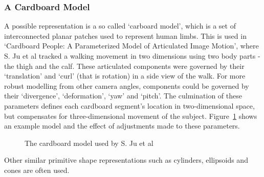 \subsubsection{A Cardboard Model}

A possible representation is a so called `carboard model', which is a set of interconnected planar patches used to represent human limbs. This is used in `Cardboard People: A Parameterized Model of Articulated Image Motion'\cite{cardboardpeople}, where S. Ju et al tracked a walking movement in two dimensions using two body parts - the thigh and the calf. These articulated components were governed by their `translation' and `curl' (that is rotation) in a side view of the walk. For more robust modelling from other camera angles, components could be governed by their `divergence', `deformation', `yaw' and `pitch'. The culmination of these parameters defines each cardboard segment's location in two-dimensional space, but compensates for three-dimensional movement of the subject. Figure~\ref{fig:cardboardmodel} shows an example model and the effect of adjustments made to these parameters.

\begin{figure}[H]
    \centering
\caption{The cardboard model used by S. Ju et al\cite{cardboardpeople}}
\label{fig:cardboardmodel}
\end{figure}

Other similar primitive shape representations such as cylinders, ellipsoids and cones are often used\cite{cvmocapsurvey}.